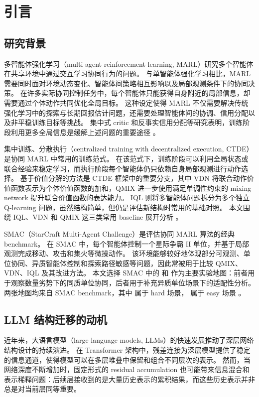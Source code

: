 \section{引言}

\subsection{研究背景}

多智能体强化学习（multi-agent reinforcement learning, MARL）研究多个智能体在共享环境中通过交互学习协同行为的问题。
与单智能体强化学习相比，MARL 需要同时面对环境动态变化、智能体间策略相互影响以及局部观测条件下的协同决策。
在许多实际协同控制任务中，每个智能体只能获得自身附近的局部信息，却需要通过个体动作共同优化全局目标。
这种设定使得 MARL 不仅需要解决传统强化学习中的探索与长期回报估计问题，还需要处理智能体间的协调、信用分配以及非平稳训练目标等挑战。
集中式 critic 和反事实信用分配等研究表明，训练阶段利用更多全局信息是缓解上述问题的重要途径 \cite{foerster2018counterfactual,lowe2017multiagent}。

集中训练、分散执行（centralized training with decentralized execution, CTDE）是协同 MARL 中常用的训练范式。
在该范式下，训练阶段可以利用全局状态或联合经验来稳定学习，而执行阶段每个智能体仍只依赖自身局部观测进行动作选择。
基于价值分解的方法是 CTDE 框架中的重要分支，其中 VDN 将联合动作价值函数表示为个体价值函数的加和，QMIX 进一步使用满足单调性约束的 mixing network 提升联合价值函数的表达能力。
IQL 则将多智能体问题拆分为多个独立 Q-learning 问题，虽然结构简单，但仍是评估新结构时常用的基础对照。
本文围绕 IQL、VDN 和 QMIX 这三类常用 baseline 展开分析 \cite{tan1993multiagent,sunehag2018value,rashid2018qmix}。

SMAC（StarCraft Multi-Agent Challenge）是评估协同 MARL 算法的经典 benchmark。
在 SMAC 中，每个智能体控制一个星际争霸 II 单位，并基于局部观测完成移动、攻击和集火等微操动作。
该环境能够较好地体现部分可观测、单位协同、异质智能体控制和探索路径敏感等问题，因此常被用于比较 QMIX、VDN、IQL 及其改进方法。
本文选择 SMAC 中的  和  作为主要实验地图：前者用于观察数量劣势下的同质单位协同，后者用于补充异质单位场景下的适配性分析。
两张地图均来自 SMAC benchmark，其中  属于 hard 场景， 属于 easy 场景 \cite{samvelyan2019starcraft}。

\subsection{LLM 结构迁移的动机}

近年来，大语言模型（large language models, LLMs）的快速发展推动了深层网络结构设计的持续演进。
在 Transformer 架构中，残差连接为深层模型提供了稳定的信息通道，使得模型可以在多层堆叠中保留和组合不同层次的表示。
然而，当网络深度不断增加时，固定形式的 residual accumulation 也可能带来信息混合和表示稀释问题：后续层接收到的是大量历史表示的累积结果，而这些历史表示并非总是对当前层同等重要。


